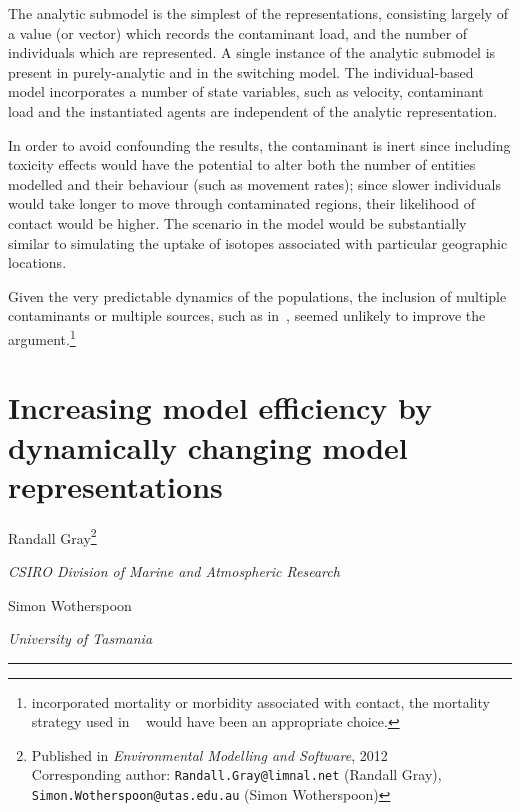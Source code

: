 The analytic submodel is the simplest of the representations,
consisting largely of a value (or vector) which records the
contaminant load, and the number of individuals which are represented.
A single instance of the analytic submodel is present in
purely-analytic and in the switching model.  The individual-based
model incorporates a number of state variables, such as velocity,
contaminant load and the instantiated agents are independent of the
analytic representation.

In order to avoid confounding the results, the contaminant is inert
since including toxicity effects would have the potential to alter
both the number of entities modelled and their behaviour (such as
movement rates); since slower individuals would take longer to move
through contaminated regions, their likelihood of contact would be
higher.  The scenario in the model would be substantially similar to
simulating the uptake of isotopes associated with particular geographic
locations.

Given the very predictable dynamics of the populations, the inclusion
of multiple contaminants or multiple sources, such as
in~\cite{gray2006nws, gray2014}, seemed unlikely to improve the
argument.\footnote{incorporated mortality or morbidity associated with
  contact, the mortality strategy used in ~\citet{grayningaloo} would
  have been an appropriate choice.}

\pagebreak

\section*{Increasing model efficiency by dynamically changing model representations}
\begin{center}
    Randall Gray\footnote{
     {Published in \emph{Environmental Modelling and Software\/}, 2012}\\
       Corresponding author:
      \texttt{Randall.Gray@limnal.net} (Randall Gray),\\
      \texttt{Simon.Wotherspoon@utas.edu.au} (Simon Wotherspoon)
    }

    \emph{CSIRO Division of Marine and Atmospheric Research\/}

    Simon Wotherspoon 

    \emph{University of Tasmania\/}
\end{center}

\rule{\textwidth}{2pt}

